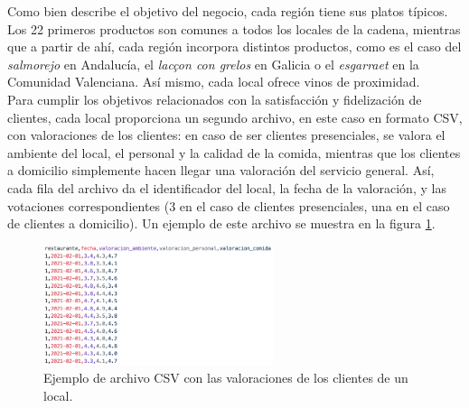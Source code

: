\documentclass[11pt]{opticajnl}
\begin{document}
Como bien describe el objetivo del negocio, cada región tiene sus platos típicos. Los 22 primeros productos son comunes a todos los locales de la cadena, mientras que a partir de ahí, cada región incorpora distintos productos, como es el caso del \textit{salmorejo} en Andalucía, el \textit{lacçon con grelos} en Galicia o el \textit{esgarraet} en la Comunidad Valenciana. Así mismo, cada local ofrece vinos de proximidad. \\

Para cumplir los objetivos relacionados con la satisfacción y fidelización de clientes, cada local proporciona un segundo archivo, en este caso en formato CSV, con valoraciones de los clientes: en caso de ser clientes presenciales, se valora el ambiente del local, el personal y la calidad de la comida, mientras que los clientes a domicilio simplemente hacen llegar una valoración del servicio general. Así, cada fila del archivo da el identificador del local, la fecha de la valoración, y las votaciones correspondientes (3 en el caso de clientes presenciales, una en el caso de clientes a domicilio). Un ejemplo de este archivo se muestra en la figura \ref{fig:csv_valoraciones}.

\begin{figure}[h]
\centering
\includegraphics[width=0.6\textwidth]{fotos/2.png}
\caption{Ejemplo de archivo CSV con las valoraciones de los clientes de un local.}
\label{fig:csv_valoraciones}
\end{figure}
\end{document}
